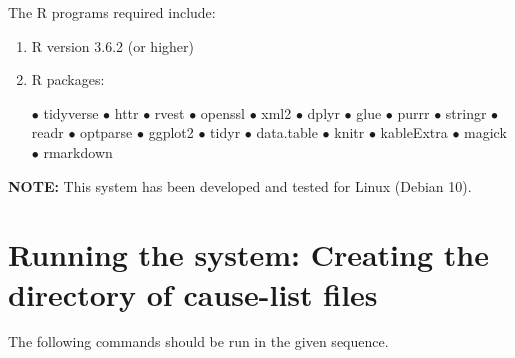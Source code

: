 \documentclass[12pt,a4paper]{article}
\begin{document}
The R programs required include:
\begin{enumerate}
\item R version 3.6.2 (or higher)
\item R packages:

  $\bullet$ tidyverse
  $\bullet$ httr
  $\bullet$ rvest
  $\bullet$ openssl
  $\bullet$ xml2
  $\bullet$ dplyr
  $\bullet$ glue
  $\bullet$ purrr
  $\bullet$ stringr
  $\bullet$ readr
  $\bullet$ optparse
  $\bullet$ ggplot2
  $\bullet$ tidyr
  $\bullet$ data.table
  $\bullet$ knitr
  $\bullet$ kableExtra
  $\bullet$ magick
  $\bullet$ rmarkdown
\end{enumerate}

\textbf{NOTE:} This system has been developed and tested for Linux (Debian 10).

\section{Running the system: Creating the directory of cause-list files}

The following commands should be run in the given sequence.
\end{document}
